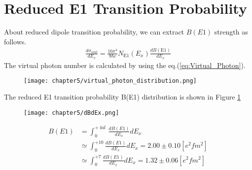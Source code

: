 \section{Reduced E1 Transition Probability}
About reduced dipole transition probability, we can extract $B(E1)$ strength as follows.
\begin{align}
    \frac{d \sigma_{coul}}{dE_x} = \frac{16 \pi^{3} }{9 \hbar c} N_{\text{E1}}(E_x) \frac{dB(\text{E1})}{dE_x}
\end{align}
The virtual photon number is calculated by using the eq.(\ref{eq:Virtual_Photon}).

\begin{figure}[h]
    \centering
    \texttt{[image: chapter5/virtual\_photon\_distribution.png]}
\end{figure}
The reduced E1 transition probability B(E1) distribution is shown in Figure \ref{fig:B(E1)}
\begin{figure}[h]
    \centering
    \texttt{[image: chapter5/dBdEx.png]}    
    \label{fig:B(E1)}
\end{figure}  

\begin{align}
    B(E1) &= \int_{0}^{+\inf} \frac{dB(E1)}{dE_x} dE_x \\
          &\simeq \int_{0}^{+10} \frac{dB(E1)}{dE_x} dE_x = 2.00 \pm 0.10  [e^{2}fm^{2}] \\
          &\simeq \int_{0}^{+7} \frac{dB(E1)}{dE_x} dE_x = 1.32 \pm 0.06  [e^{2}fm^{2}] 
\end{align}  

